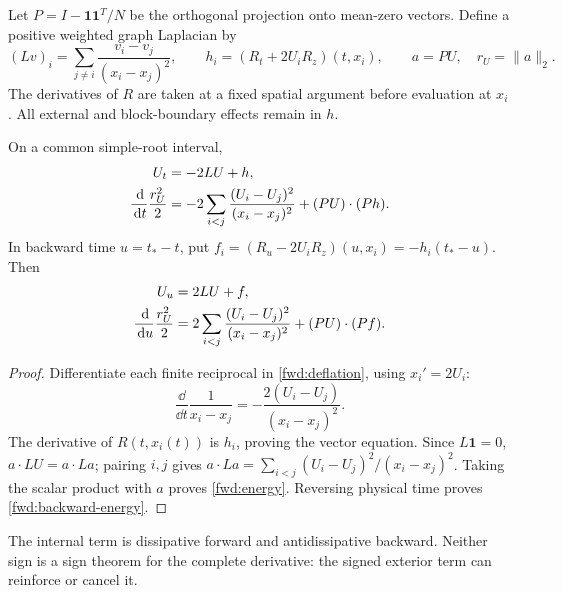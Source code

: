 Let $P=I-\mathbf1\mathbf1^{T}/N$ be the orthogonal projection onto
mean-zero vectors. Define a positive weighted graph Laplacian by
\begin{equation}
 (Lv)_i=\sum_{j\ne i}\frac{v_i-v_j}{(x_i-x_j)^2},\qquad
 h_i=(R_t+2U_iR_z)(t,x_i),\qquad
 a=PU,\quad r_U=\lVert a\rVert_2.
 \label{fwd:laplacian}
\end{equation}
The derivatives of $R$ are taken at a fixed spatial argument before
evaluation at $x_i$. All external and block-boundary effects remain in
$h$.

\begin{proposition}
\label{fwd:force-identity}
On a common simple-root interval,
\begin{align}
 U_t&=-2LU+h,\notag\\
 \frac{\,\mathrm d}{\,\mathrm d t}\frac{r_U^2}{2}
 &=-2\sum_{i<j}\frac{(U_i-U_j)^2}{(x_i-x_j)^2}
       +(PU)\mathbin{\cdot}(Ph).
 \label{fwd:energy}
\end{align}
In backward time $u=t_*-t$, put
$f_i=(R_u-2U_iR_z)(u,x_i)=-h_i(t_*-u)$. Then
\begin{align}
 U_u&=2LU+f,\notag\\
 \frac{\,\mathrm d}{\,\mathrm d u}\frac{r_U^2}{2}
 &=2\sum_{i<j}\frac{(U_i-U_j)^2}{(x_i-x_j)^2}
       +(PU)\mathbin{\cdot}(Pf).
 \label{fwd:backward-energy}
\end{align}
\end{proposition}
\begin{proof}
Differentiate each finite reciprocal in \eqref{fwd:deflation}, using
$x_i'=2U_i$:
\[
 \frac{\dd}{\dd t}\frac1{x_i-x_j}
 =-\frac{2(U_i-U_j)}{(x_i-x_j)^2}.
\]
The derivative of $R(t,x_i(t))$ is $h_i$, proving the vector equation.
Since $L\mathbf1=0$, $a\cdot LU=a\cdot La$; pairing $i,j$ gives
$a\cdot La=\sum_{i<j}(U_i-U_j)^2/(x_i-x_j)^2$.
Taking the scalar product with $a$ proves \eqref{fwd:energy}.
Reversing physical time proves \eqref{fwd:backward-energy}.
\end{proof}

The internal term is dissipative forward and antidissipative backward.
Neither sign is a sign theorem for the complete derivative: the signed
exterior term can reinforce or cancel it.

